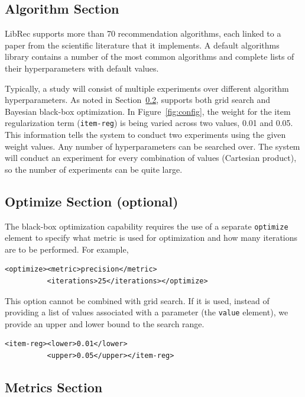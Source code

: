 \subsection{Algorithm Section}
\label{subsec:libauto_algos}

    LibRec supports more than 70 recommendation algorithms, each linked to a paper from the scientific literature that it implements. A default algorithms library contains a number of the most common algorithms and complete lists of their hyperparameters with default values.
    
    Typically, a study will consist of multiple experiments over different algorithm hyperparameters. As noted in Section~\ref{subsec:libauto_opt}, \libauto{} supports both grid search and Bayesian black-box optimization. In Figure~\ref{fig:config}, the weight for the item regularization term (\texttt{item-reg}) is being varied across two values, 0.01 and 0.05. This information tells the system to conduct two experiments using the given weight values. Any number of hyperparameters can be searched over. The system will conduct an experiment for every combination of values (Cartesian product), so the number of experiments can be quite large.

\subsection{Optimize Section (optional)}
\label{subsec:libauto_opt}
The black-box optimization capability requires the use of a separate \texttt{optimize} element to specify what metric is used for optimization and how many iterations are to be performed. For example,

{\small
\begin{verbatim}
<optimize><metric>precision</metric>
          <iterations>25</iterations></optimize>
\end{verbatim}}

This option cannot be combined with grid search. If it is used, instead of providing a list of values associated with a parameter (the \texttt{value} element), we provide an upper and lower bound to the search range.

{\small
\begin{verbatim}
<item-reg><lower>0.01</lower>
          <upper>0.05</upper></item-reg>
\end{verbatim}}

\subsection{Metrics Section}
\label{subsec:libauto_metrics}

